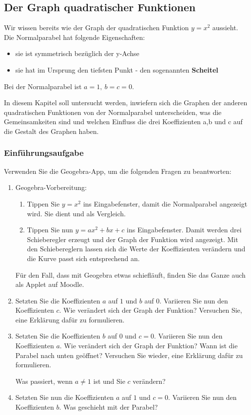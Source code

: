 \subsection{Der Graph quadratischer Funktionen}
Wir wissen bereits wie der Graph der quadratischen Funktion $y=x^2$ aussieht. Die Normalparabel hat folgende Eigenschaften:
\begin{itemize}
    \item sie ist symmetrisch bezüglich der y-Achse
    \item sie hat im Ursprung den tiefsten Punkt - den sogenannten \textbf{Scheitel}
\end{itemize}
Bei der Normalparabel ist $a=1,\ b=c=0$.

In diesem Kapitel soll untersucht werden, inwiefern sich die Graphen der anderen quadratischen Funktionen von der Normalparabel unterscheiden, was die Gemeinsamkeiten sind und welchen Einfluss die drei Koeffizienten a,b und c auf die Gestalt des Graphen haben.
\subsubsection{Einführungsaufgabe}
Verwenden Sie die Geogebra-App, um die folgenden Fragen zu beantworten:
\begin{enumerate}
    \item Geogebra-Vorbereitung:
          \begin{enumerate}
              \item Tippen Sie $y=x^2$ ins Eingabefenster, damit die Normalparabel angezeigt wird. Sie dient und als Vergleich.
              \item Tippen Sie nun $y=ax^2+bx+c$ ins Eingabefenster. Damit werden drei Schieberegler erzeugt und der Graph der Funktion wird angezeigt. Mit den Schiebereglern lassen sich die Werte der Koeffizienten verändern und die Kurve passt sich entsprechend an.
          \end{enumerate}
          Für den Fall, dass mit Geogebra etwas schiefläuft, finden Sie das Ganze auch als Applet auf Moodle.
    \item Setzten Sie die Koeffizienten $a$ auf $1$ und $b$ auf $0$. Variieren Sie nun den Koeffizienten $c$. Wie verändert sich der Graph der Funktion? Versuchen Sie, eine Erklärung dafür zu formulieren.
    \item Setzten Sie die Koeffizienten $b$ auf $0$ und $c=0$. Variieren Sie nun den Koeffizienten $a$. Wie verändert sich der Graph der Funktion? Wann ist die Parabel nach unten geöffnet? Versuchen Sie wieder, eine Erklärung dafür zu formulieren.

          Was passiert, wenn $a\neq 1$ ist und Sie $c$ verändern?
    \item Setzten Sie nun die Koeffizienten $a$ auf $1$ und $c=0$. Variieren Sie nun den Koeffizienten $b$. Was geschieht mit der Parabel?
\end{enumerate}
\newpage
